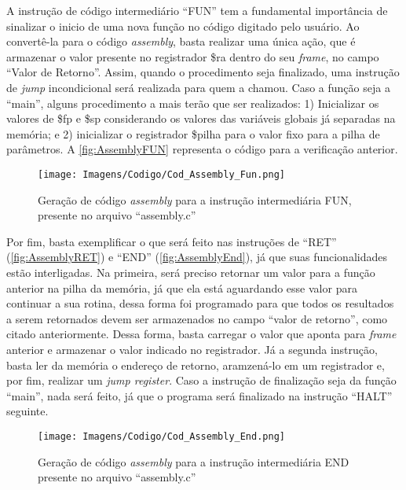 \documentclass[
	12pt,				%
	oneside,
	a4paper,			%
	english,			%
	french,				%
	spanish,			%
	brazil,				%
	]{abntex2}
\begin{document}
A instrução de código intermediário ``FUN'' tem a fundamental importância de sinalizar o inicio de uma nova função no código digitado pelo usuário. Ao convertê-la para o código \emph{assembly}, basta realizar uma única ação, que é armazenar o valor presente no registrador \$ra dentro do seu \emph{frame}, no campo ``Valor de Retorno''. Assim, quando o procedimento seja finalizado, uma instrução de \emph{jump} incondicional será realizada para quem a chamou. Caso a função seja a ``main'', alguns procedimento a mais terão que ser realizados: 1) Inicializar os valores de \$fp e \$sp considerando os valores das variáveis globais já separadas na memória; e 2) inicializar o registrador \$pilha para o valor fixo para a pilha de parâmetros. A \autoref{fig:AssemblyFUN} representa o código para a verificação anterior.

\begin{figure}[H]
\centering 
\caption{Geração de código \emph{assembly} para a instrução intermediária FUN, presente no arquivo ``assembly.c''} \label{fig:AssemblyFUN}
\graphicspath{ {./Imagens/} } 
\texttt{[image: Imagens/Codigo/Cod\_Assembly\_Fun.png]}
\end{figure}


Por fim, basta exemplificar o que será feito nas instruções de ``RET'' (\autoref{fig:AssemblyRET}) e ``END'' (\autoref{fig:AssemblyEnd}), já que suas funcionalidades estão interligadas. Na primeira, será preciso retornar um valor para a função anterior na pilha da memória, já que ela está aguardando esse valor para continuar a sua rotina, dessa forma foi programado para que todos os resultados a serem retornados devem ser armazenados no campo ``valor de retorno'', como citado anteriormente. Dessa forma, basta carregar o valor que aponta para \emph{frame} anterior e armazenar o valor indicado no registrador. Já a segunda instrução, basta ler da memória o endereço de retorno, aramzená-lo em um registrador e, por fim, realizar um \emph{jump register}. Caso a instrução de finalização seja da função ``main'', nada será feito, já que o programa será finalizado na instrução ``HALT'' seguinte.

\begin{figure}[H]
\centering 
\caption{Geração de código \emph{assembly} para a instrução intermediária END presente no arquivo ``assembly.c''} \label{fig:AssemblyEnd}
\graphicspath{ {./Imagens/} } 
\texttt{[image: Imagens/Codigo/Cod\_Assembly\_End.png]}
\end{figure}
\end{document}
